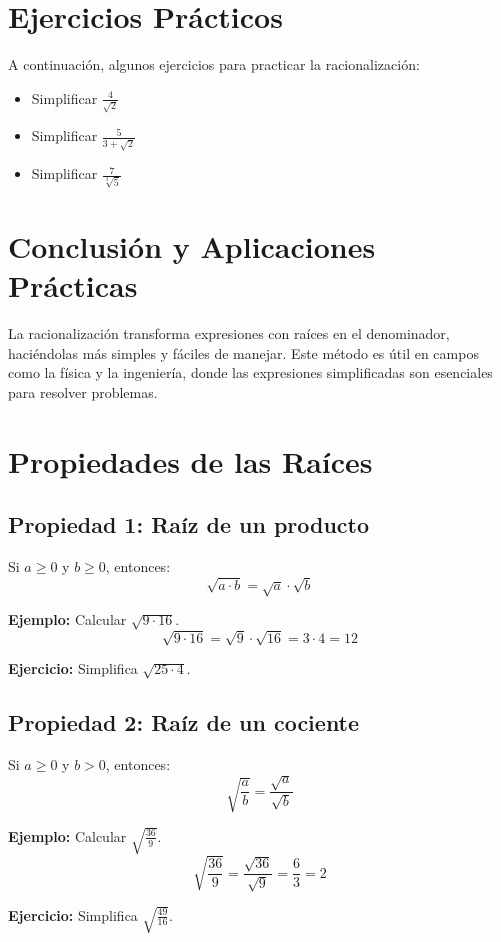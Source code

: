 \documentclass[
  11pt,
  letterpaper,
  answers
]{exam}
\begin{document}
\section{Ejercicios Prácticos}
A continuación, algunos ejercicios para practicar la racionalización:
\begin{itemize}
    \item Simplificar \( \frac{4}{\sqrt{2}} \)
    \item Simplificar \( \frac{5}{3 + \sqrt{2}} \)
    \item Simplificar \( \frac{7}{\sqrt[3]{5}} \)
\end{itemize}

\section{Conclusión y Aplicaciones Prácticas}
La racionalización transforma expresiones con raíces en el denominador, haciéndolas más simples y fáciles de manejar. Este método es útil en campos como la física y la ingeniería, donde las expresiones simplificadas son esenciales para resolver problemas.

\section*{Propiedades de las Raíces}

\subsection*{Propiedad 1: Raíz de un producto}
Si \( a \geq 0 \) y \( b \geq 0 \), entonces:
\[
\sqrt{a \cdot b} = \sqrt{a} \cdot \sqrt{b}
\]

\textbf{Ejemplo:} Calcular \( \sqrt{9 \cdot 16} \).
\[
\sqrt{9 \cdot 16} = \sqrt{9} \cdot \sqrt{16} = 3 \cdot 4 = 12
\]

\textbf{Ejercicio:} Simplifica \( \sqrt{25 \cdot 4} \).

\subsection*{Propiedad 2: Raíz de un cociente}
Si \( a \geq 0 \) y \( b > 0 \), entonces:
\[
\sqrt{\frac{a}{b}} = \frac{\sqrt{a}}{\sqrt{b}}
\]

\textbf{Ejemplo:} Calcular \( \sqrt{\frac{36}{9}} \).
\[
\sqrt{\frac{36}{9}} = \frac{\sqrt{36}}{\sqrt{9}} = \frac{6}{3} = 2
\]

\textbf{Ejercicio:} Simplifica \( \sqrt{\frac{49}{16}} \).
\end{document}

